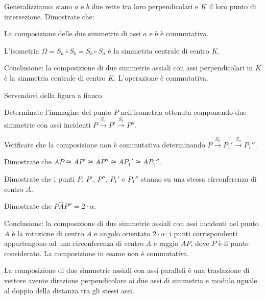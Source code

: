Generalizziamo: siano $a$ e $b$ due rette tra loro perpendicolari e 
$K$ il loro punto di intersezione. Dimostrate che:
\begin{itemize*}
\item La composizione delle due simmetrie di assi $a$ e $b$ è 
commutativa.
\item L'isometria $\Omega = S_a\circ S_b = S_b \circ S_a$ è la 
simmetria centrale di centro $K$.
\end{itemize*}

Conclusione: la composizione di due simmetrie assiali con assi 
perpendicolari in $K$ è la simmetria centrale di centro $K$. 
L'operazione è commutativa.
\pagebreak
\begin{exrig}
\noindent\begin{minipage}{0.6\textwidth}\parindent15pt
\begin{esempio}
Servendovi della figura a fianco
\begin{itemize*}
\item Determinate l'immagine del punto $P$ nell'isometria ottenuta 
componendo due simmetrie con assi incidenti 
$P\overset{S_a}\rightarrow P' \overset{S_b}\rightarrow P''$.
\item Verificate che la composizione non è commutativa determinando 
$P\overset{S_b}\rightarrow P_1' \overset{S_a}\rightarrow P_1''$.
\item Dimostrate che $AP \cong AP'\cong AP''\cong AP_1' \cong AP_1''$.
\item Dimostrate che i punti $P$, $P'$, $P''$, $P_1'$ e $P_1''$ 
stanno su una stessa circonferenza di centro $A$.
\item Dimostrate che $P\widehat{A}P''=2\cdot \alpha$.
\end{itemize*}
\end{esempio}
\end{minipage}\hfil
\begin{minipage}{0.4\textwidth}
	\centering
\end{minipage}\vspace{5pt}
\end{exrig}
			
Conclusione: la composizione di due simmetrie assiali con assi 
incidenti nel punto $A$ è la rotazione di centro $A$ e angolo 
orientato $2\cdot \alpha$; i punti corrispondenti appartengono ad una 
circonferenza di centro $A$ e raggio $AP$, dove $P$ è il punto 
considerato. La composizione in esame non è commutativa.
			
\begin{proposizione}
La composizione di due simmetrie assiali con assi paralleli è una 
traslazione di vettore avente direzione perpendicolare ai due assi di 
simmetria e modulo uguale al doppio della distanza tra gli stessi 
assi.
\end{proposizione}
			
